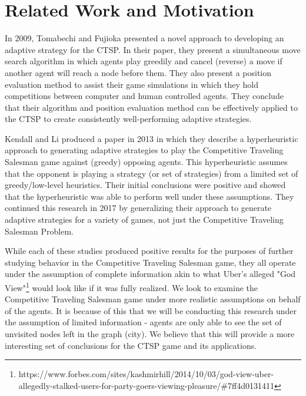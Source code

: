 \documentclass[pageno]{jpaper}
\begin{document}
\section{Related Work and Motivation}

In 2009, Tomabechi and Fujioka \cite{5228521} presented a novel approach to developing an adaptive strategy for the CTSP. In their paper, they present a simultaneous move search algorithm in which agents play greedily and cancel (reverse) a move if another agent will reach a node before them. They also present a position evaluation method to assist their game simulations in which they hold competitions between computer and human controlled agents. They conclude that their algorithm and position evaluation method can be effectively applied to the CTSP to create consistently well-performing adaptive strategies.\par

Kendall and Li \cite{10.2307/23355415} produced a paper in 2013 in which they describe a hyperheuristic approach to generating adaptive strategies to play  the Competitive Traveling Salesman game against (greedy) opposing agents. This hyperheuristic assumes that the opponent is playing a strategy (or set of strategies) from a limited set of greedy/low-level heuristics. Their initial conclusions were positive and showed that the hyperheuristic was able to perform well under these assumptions. They continued this research in 2017 \cite{7017583} by generalizing their approach to generate adaptive strategies for a variety of games, not just the Competitive Traveling Salesman Problem.\par

While each of these studies produced positive results for the purposes of further studying behavior in the Competitive Traveling Salesman game, they all operate under the assumption of complete information akin to what Uber's alleged "God View"\footnote{https://www.forbes.com/sites/kashmirhill/2014/10/03/god-view-uber-allegedly-stalked-users-for-party-goers-viewing-pleasure/\#7ff4d0131411} would look like if it was fully realized. We look to examine the Competitive Traveling Salesman game under more realistic assumptions on behalf of the agents. It is because of this that we will be conducting this research under the assumption of limited information - agents are only able to see the set of unvisited nodes left in the graph (city). We believe that this will provide a more interesting set of conclusions for the CTSP game and its applications.\newline
\end{document}
